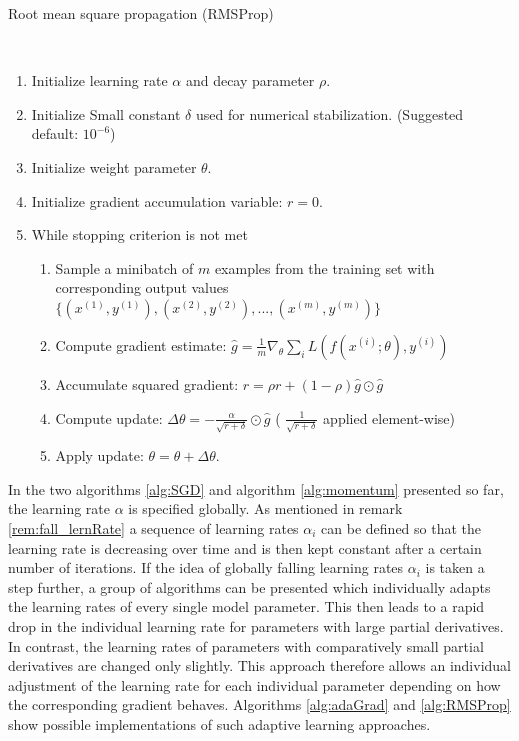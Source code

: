 \begin{algorithm}
	\caption{Root mean square propagation (RMSProp)  \cite{goodfellow2016deep}}\label{alg:RMSProp}
	\begin{algorithmic}
		\\
		\begin{enumerate}
			\item Initialize learning rate $\alpha$ and decay parameter $\rho$.		
			\item Initialize Small constant $\delta$ used for numerical stabilization. (Suggested default: $10^{-6}$)
			\item Initialize weight parameter $\theta$.
			\item Initialize gradient accumulation variable: $r = 0$.
			\item While stopping criterion is not met
			\begin{enumerate}[label=\emph{\alph*})]
				\item Sample a minibatch of $m$ examples from the training set with corresponding output values
				$\{(x^{(1)}, y^{(1)}), (x^{(2)}, y^{(2)}), ..., (x^{(m)}, y^{(m)})\}$
				\item Compute gradient estimate: $\hat{g} = \frac{1}{m} \nabla_\theta \sum_i L(f(x^{(i)};\theta), y^{(i)})$
				\item Accumulate squared gradient: $r = \rho r + (1 - \rho)\hat{g} \odot \hat{g}$
				\item Compute update: $\Delta \theta = - \frac{\alpha}{\sqrt{r + \delta}} \odot \hat{g}$ ( $\frac{1}{\sqrt{r + \delta}}$ applied element-wise)
				\item Apply update: $\theta = \theta + \Delta \theta$.
			\end{enumerate}
		\end{enumerate}
	\end{algorithmic}
\end{algorithm}

In the two algorithms \ref{alg:SGD} and algorithm \ref{alg:momentum} presented so far, the learning rate $\alpha$ is specified globally. As mentioned in remark \ref{rem:fall_lernRate} a sequence of learning rates $\alpha_i$ can be defined so that the learning rate is decreasing over time and is then kept constant after a certain number of iterations. If the idea of globally falling learning rates $\alpha_i$ is taken a step further, a group of algorithms can be presented which individually adapts the learning rates of every single model parameter. This then leads to a rapid drop in the individual learning rate for parameters with large partial derivatives. In contrast, the learning rates of parameters with comparatively small partial derivatives are changed only slightly. This approach therefore allows an individual adjustment of the learning rate for each individual parameter depending on how the corresponding gradient behaves. Algorithms \ref{alg:adaGrad} and \ref{alg:RMSProp} show possible implementations of such adaptive learning approaches.

